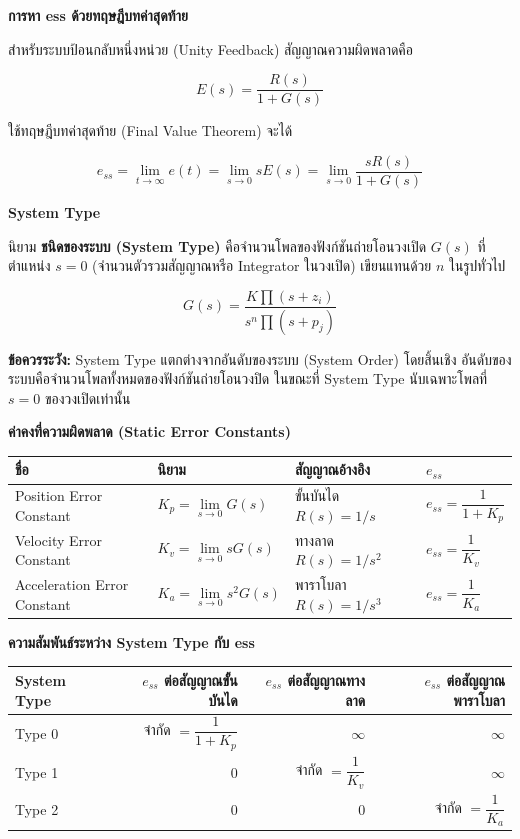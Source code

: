 \textbf{การหา ess ด้วยทฤษฎีบทค่าสุดท้าย}

สำหรับระบบป้อนกลับหนึ่งหน่วย (Unity Feedback) สัญญาณความผิดพลาดคือ

\[
E(s) = \frac{R(s)}{1+G(s)}
\]

ใช้ทฤษฎีบทค่าสุดท้าย (Final Value Theorem) จะได้

\[
e_{ss} = \lim_{t\to\infty} e(t) = \lim_{s\to0} sE(s) = \lim_{s\to0}\frac{sR(s)}{1+G(s)}
\]

\textbf{System Type}

นิยาม \textbf{ชนิดของระบบ (System Type)} คือจำนวนโพลของฟังก์ชันถ่ายโอนวงเปิด $G(s)$ ที่ตำแหน่ง $s=0$ (จำนวนตัวรวมสัญญาณหรือ Integrator ในวงเปิด) เขียนแทนด้วย $n$ ในรูปทั่วไป

\[
G(s) = \frac{K\prod(s+z_i)}{s^n\prod(s+p_j)}
\]

\textbf{ข้อควรระวัง:} System Type แตกต่างจากอันดับของระบบ (System Order) โดยสิ้นเชิง อันดับของระบบคือจำนวนโพลทั้งหมดของฟังก์ชันถ่ายโอนวงปิด ในขณะที่ System Type นับเฉพาะโพลที่ $s=0$ ของวงเปิดเท่านั้น

\textbf{ค่าคงที่ความผิดพลาด (Static Error Constants)}

\begin{table}[htbp]
    \centering
    \begin{tabular}{llll}
        \hline
        \textbf{ชื่อ} & \textbf{นิยาม} & \textbf{สัญญาณอ้างอิง} & \textbf{$e_{ss}$} \\
        \hline
        Position Error Constant & $K_p = \lim\limits_{s\to0} G(s)$ & ขั้นบันได $R(s)=1/s$ & $e_{ss} = \dfrac{1}{1+K_p}$ \\
        Velocity Error Constant & $K_v = \lim\limits_{s\to0} sG(s)$ & ทางลาด $R(s)=1/s^2$ & $e_{ss} = \dfrac{1}{K_v}$ \\
        Acceleration Error Constant & $K_a = \lim\limits_{s\to0} s^2G(s)$ & พาราโบลา $R(s)=1/s^3$ & $e_{ss} = \dfrac{1}{K_a}$ \\
        \hline
    \end{tabular}
\end{table}

\textbf{ความสัมพันธ์ระหว่าง System Type กับ ess}

\begin{table}[htbp]
    \centering
    \begin{tabular}{lrrr}
        \hline
        \textbf{System Type} & \textbf{$e_{ss}$ ต่อสัญญาณขั้นบันได} & \textbf{$e_{ss}$ ต่อสัญญาณทางลาด} & \textbf{$e_{ss}$ ต่อสัญญาณพาราโบลา} \\
        \hline
        Type 0 & จำกัด $= \dfrac{1}{1+K_p}$ & $\infty$ & $\infty$ \\
        Type 1 & $0$ & จำกัด $= \dfrac{1}{K_v}$ & $\infty$ \\
        Type 2 & $0$ & $0$ & จำกัด $= \dfrac{1}{K_a}$ \\
        \hline
    \end{tabular}
\end{table}

